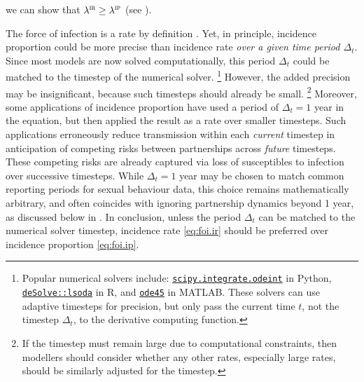 we can show that $\lambda^\textsc{ir} \ge \lambda^\textsc{ip}$ (see ).
\par
The force of infection is a rate by definition \cite{Anderson1991}.
Yet, in principle, incidence proportion could be more precise than incidence rate
\emph{over a given time period $\Delta_t$}.
Since most models are now solved computationally,
this period $\Delta_t$ could be matched to the timestep of the numerical solver.%
\footnote{\label{foot:ode}%
  Popular numerical solvers include:
  \href{https://docs.scipy.org/doc/scipy/reference/generated/scipy.integrate.odeint.html}
  {\texttt{scipy.integrate.odeint}} in Python,
  \href{https://cran.r-project.org/web/packages/deSolve/index.html}
  {\texttt{deSolve::lsoda}} in R, and
  \href{https://www.mathworks.com/help/matlab/ref/ode45.html}
  {\texttt{ode45}} in MATLAB.
  These solvers can use adaptive timesteps for precision,
  but only pass the current time $t$, not the timestep $\Delta_t$, to the derivative computing function.}
However, the added precision may be insignificant, because such timesteps should already be small.%
\footnote{If the timestep must remain large due to computational constraints, then
  modellers should consider whether any other rates, especially large rates,
  should be similarly adjusted for the timestep.}
Moreover, some applications of incidence proportion have used
a period of $\Delta_t = 1$ year in the equation, but then
applied the result as a rate over smaller timesteps.
Such applications erroneously reduce transmission within each \emph{current} timestep
in anticipation of competing risks between partnerships across \emph{future} timesteps.
These competing risks are already captured via
loss of susceptibles to infection over successive timesteps.
While $\Delta_t = 1$ year may be chosen to match common reporting periods for sexual behaviour data,
this choice remains mathematically arbitrary,
and often coincides with ignoring partnership dynamics beyond 1 year,
as discussed below in .
In conclusion, unless the period $\Delta_t$ can be matched to the numerical solver timestep,
incidence rate \eqref{eq:foi.ir} should be preferred over incidence proportion \eqref{eq:foi.ip}.

